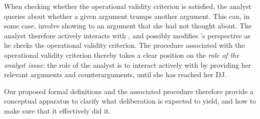 \documentclass[version=3.21, pagesize, twoside=off, bibliography=totoc, DIV=calc, fontsize=12pt, a4paper, french, english]{scrartcl}
\begin{document}
When checking whether the operational validity criterion is satisfied, the analyst queries \thedm{} about whether a given argument trumps another argument. This can, in some case, involve showing to \thedm{} an argument that she had not thought about. The analyst therefore actively interacts with \thedm, and possibly modifies \thedm’s perspective as he checks the operational validity criterion. 
The procedure associated with the operational validity criterion thereby takes a clear position on the \emph{role of the analyst issue}: the role of the analyst is to interact actively with \thedm{} by providing her relevant arguments and counterarguments, until she has reached her \ac{DJ}.

Our proposed formal definitions and the associated procedure therefore provide a conceptual apparatus to clarify what deliberation is expected to yield, and how to make sure that it effectively did it. 

\end{document}
